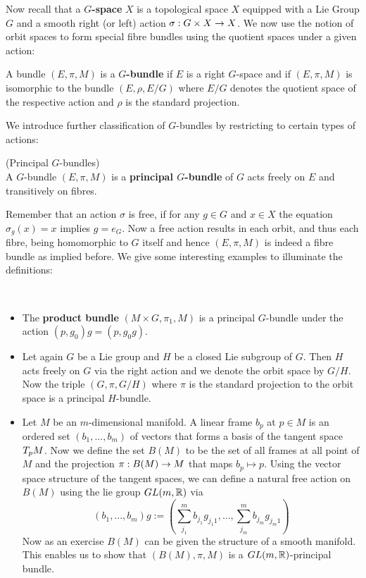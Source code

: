 Now recall that a \textbf{$G$-space} $X$ is a topological space $X$ equipped with a Lie Group $G$ and a smooth right (or left) action $\sigma:G\times X \rightarrow X$. We now use the notion of orbit spaces to form special fibre bundles using the quotient spaces under a given action:

\begin{definition}
  A bundle $(E,\pi,M)$ is a \textbf{$G$-bundle} if $E$ is a right $G$-space and if $(E,\pi,M)$ is isomorphic to the bundle $(E,\rho,E/G)$ where $E/G$ denotes the quotient space of the respective action and $\rho$ is the standard projection.
\end{definition}

We introduce further classification of $G$-bundles by restricting to certain types of actions:

\begin{definition} (Principal $G$-bundles)\\
  A $G$-bundle $(E,\pi,M)$ is a \textbf{principal $G$-bundle} of $G$ acts freely on $E$ and transitively on fibres.
\end{definition}

Remember that an action $\sigma$ is free, if for any $g\in G$ and $x\in X$ the equation $\sigma_g(x) = x$ implies $g = e_G$. Now a free action results in each orbit, and thus each fibre, being homomorphic to $G$ itself and hence $(E,\pi,M)$ is indeed a fibre bundle as implied before. We give some interesting examples to illuminate the definitions:

\begin{example}~
\begin{itemize}
  \item The \textbf{product bundle} $(M\times G, \pi_1, M)$ is a principal $G$-bundle under the action $(p, g_0)g = (p, g_0 g)$.

  \item Let again $G$ be a Lie group and $H$ be a closed Lie subgroup of $G$. Then $H$ acts freely on $G$ via the right action and we denote the orbit space by $G/H$. Now the triple $(G,\pi, G/H)$ where $\pi$ is the standard projection to the orbit space is a principal $H$-bundle.

  \item Let $M$ be an $m$-dimensional manifold. A linear frame $b_p$ at $p\in M$ is an ordered set $(b_1, ..., b_m)$ of vectors that forms a basis of the tangent space $T_p M$. Now we define the set $B(M)$ to be the set of all frames at all point of $M$ and the projection $\pi:B(M)\rightarrow M$ that maps $b_p \mapsto p$. Using the vector space structure of the tangent spaces, we can define a natural free action on $B(M)$ using the lie group $GL(m,\mathbb{R})$ via
  $$ (b_1, ...,b_m)g := \left( \sum_{j_1}^m b_{j_1} g_{j_1 1}, ..., \sum_{j_m}^m b_{j_m} g_{j_m 1} \right) $$
  Now as an exercise $B(M)$ can be given the structure of a smooth manifold. This enables us to show that $(B(M), \pi, M)$ is a $GL(m,\mathbb{R})$-principal bundle.
\end{itemize}
\end{example}

